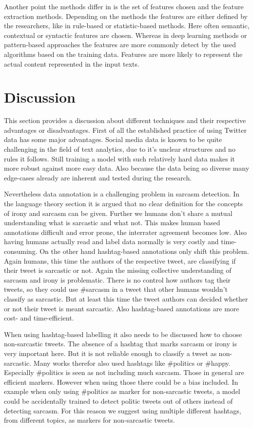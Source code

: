\documentclass[sigconf,  review=false, nonacm=true]{acmart}
\begin{document}
Another point the methods differ in is the set of features chosen and the feature extraction methods. Depending on the methods the features are either defined by the researchers, like in rule-based or statistic-based methods. Here often semantic, contextual or syntactic features are chosen. Whereas in deep learning methods or pattern-based approaches the features are more commonly detect by the used algorithms based on the training data. Features are more likely to represent the actual content represented in the input texts.

\section{Discussion}

This section provides a discussion about different techniques and their respective advantages or disadvantages. First of all the established practice of using Twitter data has some major advantages. Social media data is known to be quite challenging in the field of text analytics, due to it's unclear structures and no rules it follows. Still training a model with such relatively hard data makes it more robust against more easy data. Also because the data being so diverse many edge-cases already are inherent and tested during the research.

Nevertheless data annotation is a challenging problem in sarcasm detection. In the language theory section it is argued that no clear definition for the concepts of irony and sarcasm can be given. Further we humans don't share a mutual understanding what is sarcastic and what not. This makes human based annotations difficult and error prone, the interrater agreement becomes low. Also having humans actually read and label data normally is very costly and time-consuming. 
On the other hand hashtag-based annotations only shift this problem. Again humans, this time the authors of the respective tweet, are classifying if their tweet is sarcastic or not. Again the missing collective understanding of sarcasm and irony is problematic. There is no control how authors tag their tweets, so they could use \#sarcasm in a tweet that other humans wouldn't classify as sarcastic. But at least this time the tweet authors can decided whether or not their tweet is meant sarcastic. Also hashtag-based annotations are more cost- and time-efficient.

When using hashtag-based labelling it also needs to be discussed how to choose non-sarcastic tweets. The absence of a hashtag that marks sarcasm or irony is very important here. But it is not reliable enough to classify a tweet as non-sarcastic. Many works therefor also used hashtags like \#politics or \#happy. Especially \#politics is seen as not including much sarcasm. Those in general are efficient markers. However when using those there could be a bias included. In example when only using \#politics as marker for non-sarcastic tweets, a model could be accidentally trained to detect politic tweets out of others instead of detecting sarcasm. For this reason we suggest using multiple different hashtags, from different topics, as markers for non-sarcastic tweets.
\end{document}
